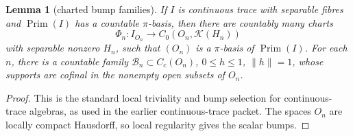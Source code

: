 \documentclass[11pt]{article}
\newtheorem{lemma}{Lemma}
\newcommand{\Kcal}{\mathcal K}
\newcommand{\Prim}{\operatorname{Prim}}
\begin{document}
\begin{lemma}[charted bump families]
\label{lem:charts}
If \(I\) is continuous trace with separable fibres and \(\Prim(I)\) has a
countable \(\pi\)-basis, then there are countably many charts
\[
        \Phi_n:I_{O_n}\longrightarrow C_0(O_n,\Kcal(H_n))
\]
with separable nonzero \(H_n\), such that \((O_n)\) is a \(\pi\)-basis of
\(\Prim(I)\).  For each \(n\), there is a countable family
\(\mathcal B_n\subset C_c(O_n)\), \(0\le h\le1\), \(\|h\|=1\), whose supports
are cofinal in the nonempty open subsets of \(O_n\).
\end{lemma}

\begin{proof}
This is the standard local triviality and bump selection for continuous-trace
algebras, as used in the earlier continuous-trace packet.  The spaces \(O_n\)
are locally compact Hausdorff, so local regularity gives the scalar bumps.
\end{proof}
\end{document}
